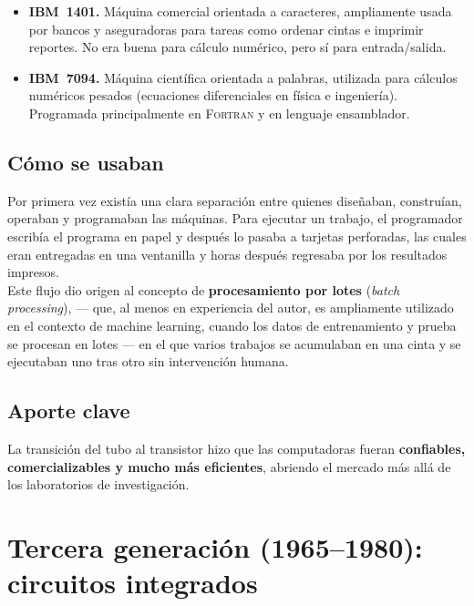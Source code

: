 \documentclass[10pt,letterpaper,twocolumn]{article}
\begin{document}
\begin{itemize}[leftmargin=*,itemsep=0.2em]
  \item \textbf{IBM~1401.} Máquina comercial orientada a caracteres,
    ampliamente usada por bancos y aseguradoras para tareas como ordenar
    cintas e imprimir reportes. No era buena para cálculo numérico, pero
    sí para entrada/salida.
  \item \textbf{IBM~7094.} Máquina científica orientada a palabras,
    utilizada para cálculos numéricos pesados (ecuaciones diferenciales
    en física e ingeniería). Programada principalmente en
    \textsc{Fortran} y en lenguaje ensamblador.
\end{itemize}

\subsection{Cómo se usaban}

Por primera vez existía una clara separación entre quienes diseñaban,
construían, operaban y programaban las máquinas. Para ejecutar un
trabajo, el programador escribía el programa en papel y después lo pasaba a
tarjetas perforadas, las cuales eran entregadas en una ventanilla y horas
después regresaba por los resultados impresos. \\
Este flujo dio origen al concepto de \textbf{procesamiento por lotes} 
(\emph{batch processing}), --- que, al menos en experiencia del autor, es 
ampliamente utilizado en el contexto de machine learning, cuando los datos de 
entrenamiento y prueba se procesan en lotes --- 
en el que varios trabajos se acumulaban en una cinta y se ejecutaban uno tras 
otro sin intervención humana.

\subsection{Aporte clave}

La transición del tubo al transistor hizo que las computadoras fueran
\textbf{confiables, comercializables y mucho más eficientes}, abriendo
el mercado más allá de los laboratorios de investigación.

\section{Tercera generación (1965--1980): circuitos integrados}
\end{document}
